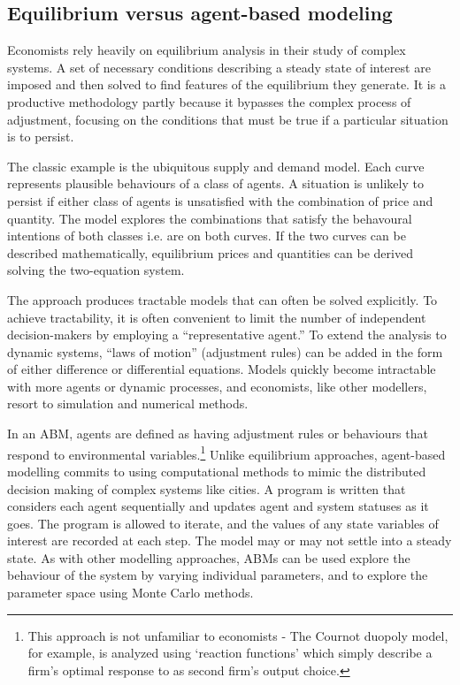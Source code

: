 \subsection{Equilibrium versus agent-based modeling}

Economists rely heavily on equilibrium analysis in their study of complex systems. 
A set of necessary conditions describing a steady state of interest are imposed and then solved to find features of the equilibrium they generate. It is a productive methodology partly because it  bypasses the complex process of adjustment, focusing on the conditions that must be true if a particular situation is to persist.

The classic example is the ubiquitous supply and demand model. Each curve represents plausible behaviours of a class of agents. A situation is unlikely to persist if either class of agents is unsatisfied with the combination of price and quantity. The model explores the combinations that satisfy the behavoural intentions of both classes i.e. are on both curves. If the two curves can be described mathematically, equilibrium prices and quantities can be derived solving the two-equation system.

The approach produces tractable models that can often be solved explicitly. To achieve tractability, it is often convenient 
to limit the number of independent decision-makers by employing a ``representative agent.'' To extend the analysis to dynamic systems, ``laws of motion'' (adjustment rules) can be added in the form of either difference or differential equations.  Models quickly become intractable with more agents or dynamic 
processes, and economists, like other modellers, resort to simulation 
and numerical methods. 

In an \gls{ABM}, agents are defined as having adjustment rules or behaviours that respond to environmental variables.\footnote{This approach is not unfamiliar to economists - The Cournot duopoly model, for example, is analyzed using `reaction functions' which simply describe a firm's optimal response to as second firm's output choice.} 
Unlike equilibrium approaches, agent-based modelling commits to using computational methods to mimic the distributed decision making of complex systems like cities. A program is written that considers each agent sequentially and updates agent and system statuses as it goes. The program is allowed to iterate, and the values of any state variables of interest are recorded at each step. The model may or may not settle into a steady state. As with other modelling approaches, ABMs can be used explore the behaviour of the system by varying individual parameters, and to explore the parameter space using Monte Carlo methods.

